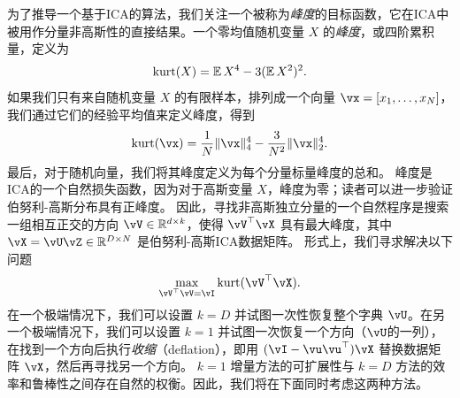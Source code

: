 \documentclass[../../book-main.tex]{subfiles}
\begin{document}
为了推导一个基于ICA的算法，我们关注一个被称为\textit{峰度}的目标函数，它在ICA中被用作分量非高斯性的直接结果。一个零均值随机变量 $X$ 的\textit{峰度}，或四阶累积量，定义为
\begin{equation}\label{eq:kurtosis}
\mathop{\mathrm{kurt}}(X) = \operatorname{\mathbb{E}}{X^4} - 3 (\operatorname{\mathbb{E}}{X^2})^2.
\end{equation}
如果我们只有来自随机变量 $X$ 的有限样本，排列成一个向量 $\vx = [x_1, \dots, x_N]$，我们通过它们的经验平均值来定义峰度，得到
\begin{equation}\label{eq:kurtosis-vector}
\kurt(\vx) = \frac{1}{N} \norm{\vx}_4^4 - \frac{3}{N^2} \norm{\vx}_2^4.
\end{equation}
最后，对于随机向量，我们将其峰度定义为每个分量标量峰度的总和。
峰度是ICA的一个自然损失函数，因为对于高斯变量 $X$，峰度为零；读者可以进一步验证伯努利-高斯分布具有正峰度。
因此，寻找非高斯独立分量的一个自然程序是搜索一组相互正交的方向 $\vV \in \R^{d \times k}$，使得 $\vV^\top \vX$ 具有最大峰度，其中 $\vX = \vU \vZ \in \R^{D \times N}$ 是伯努利-高斯ICA数据矩阵。
形式上，我们寻求解决以下问题
\begin{equation}
    \max_{\vV^\top \vV = \vI} \kurt(\vV^\top \vX).
\end{equation}
在一个极端情况下，我们可以设置 $k = D$ 并试图一次性恢复整个字典 $\vU$。在另一个极端情况下，我们可以设置 $k=1$ 并试图一次恢复一个方向（$\vU$的一列），在找到一个方向后执行\textit{收缩}（deflation），即用 $(\vI - \vu\vu^\top) \vX$ 替换数据矩阵 $\vX$，然后再寻找另一个方向。
$k=1$ 增量方法的可扩展性与 $k=D$ 方法的效率和鲁棒性之间存在自然的权衡。因此，我们将在下面同时考虑这两种方法。
\end{document}
